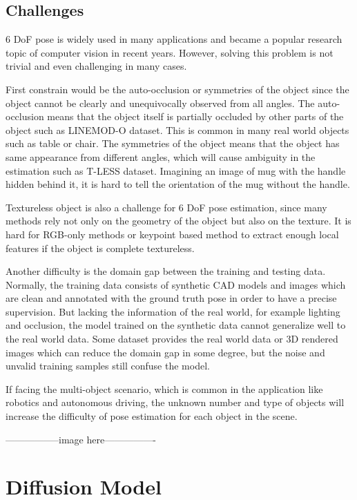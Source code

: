 \documentclass[12pt,DIV14,BCOR12mm,a4paper,footinclude=false,headinclude,parskip=half-,twoside,openright,cleardoublepage=empty,toc=index,bibliography=totoc,listof=totoc]{scrreprt}
\numberwithin{equation}{chapter}
\begin{document}
\subsection{Challenges}
6 DoF pose is widely used in many applications and became a popular research topic of computer vision in recent years. However, solving this problem is not trivial and even challenging in many cases.

First constrain would be the auto-occlusion or symmetries of the object since the object cannot be clearly and unequivocally observed from all angles\cite{maru2022}. The auto-occlusion means that the object itself is partially occluded by other parts of the object such as LINEMOD-O dataset\cite{dataV4MUMX2020}. This is common in many real world objects such as table or chair. The symmetries of the object means that the object has same appearance from different angles, which will cause ambiguity in the estimation such as T-LESS dataset\cite{hodan2017tless}. Imagining an image of mug with the handle hidden behind it, it is hard to tell the orientation of the mug without the handle.

Textureless object is also a challenge for 6 DoF pose estimation, since many methods rely not only on the geometry of the object but also on the texture. It is hard for RGB-only methods\cite{kendall2016posenet} or keypoint based method\cite{pavlakos20176dof} to extract enough local features if the object is complete textureless.

Another difficulty is the domain gap between the training and testing data. Normally, the training data consists of synthetic CAD models and images which are clean and annotated with the ground truth pose in order to have a precise supervision. But lacking the information of the real world, for example lighting and occlusion, the model trained on the synthetic data cannot generalize well to the real world data. Some dataset provides the real world data or 3D rendered images which can reduce the domain gap in some degree\cite{hodan2019photorealistic}, but the noise and unvalid training samples still confuse the model.

If facing the multi-object scenario, which is common in the application like robotics and autonomous driving, the unknown number and type of objects will increase the difficulty of pose estimation for each object in the scene.

-----------------image here----------------

\section{Diffusion Model}
\end{document}
